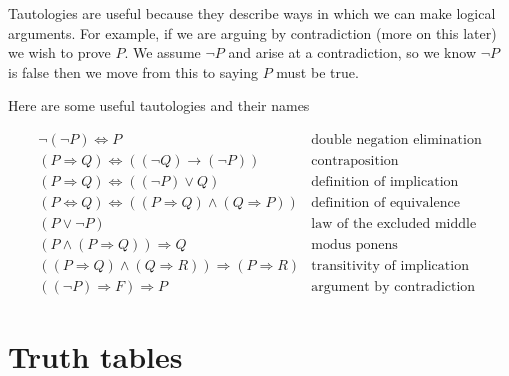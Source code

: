 \documentclass[
]{book}
\theoremstyle{definition}
\theoremstyle{definition}
\theoremstyle{definition}
\theoremstyle{definition}
\theoremstyle{remark}
\begin{document}
Tautologies are useful because they describe ways in which we can make logical arguments. For example, if we are arguing by contradiction (more on this later) we wish to prove \(P\). We assume \(\neg P\) and arise at a contradiction, so we know \(\neg P\) is false then we move from this to saying \(P\) must be true.

Here are some useful tautologies and their names

\begin{equation}
\begin{array}{lr}
\neg (\neg P) \Leftrightarrow P & \mbox{double negation elimination}\\
(P \Rightarrow Q) \Leftrightarrow ((\neg Q) \rightarrow (\neg P)) & \mbox{contraposition}\\
(P \Rightarrow Q) \Leftrightarrow ((\neg P) \vee Q) & \mbox{definition of implication}\\
(P \Leftrightarrow Q) \Leftrightarrow ((P \Rightarrow Q) \wedge (Q \Rightarrow P)) & \mbox{definition of equivalence}\\
(P \vee \neg P) & \mbox{law of the excluded middle}\\
(P \wedge (P \Rightarrow Q)) \Rightarrow Q & \mbox{modus ponens}\\
((P \Rightarrow Q) \wedge (Q \Rightarrow R)) \Rightarrow (P \Rightarrow R) & \mbox{transitivity of implication}\\
((\neg P)\Rightarrow F)\Rightarrow P & \mbox{argument by contradiction}
\end{array}
\end{equation}

\section{Truth tables}\label{truth-tables}
\end{document}
